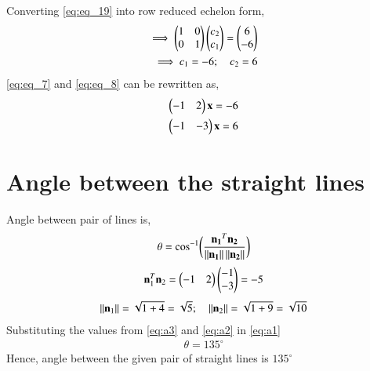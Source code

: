 \documentclass[journal,12pt,twocolumn]{IEEEtran}
\begin{document}
Converting \eqref{eq:eq_19} into row reduced echelon form,
\begin{align}
    \implies \begin{pmatrix}1 & 0 \\ 0 & 1\end{pmatrix}\begin{pmatrix}c_2 \\ c_1\end{pmatrix} = \begin{pmatrix}6 \\ -6\end{pmatrix} \nonumber\\
    \implies c_1 = -6; \quad c_2 = 6 \label{eq:eq_20}
\end{align}
\eqref{eq:eq_7} and \eqref{eq:eq_8} can be rewritten as,
\begin{align}
    \begin{pmatrix}-1 & 2\end{pmatrix}\mathbf{x} = -6 \\
    \begin{pmatrix}-1 & -3\end{pmatrix}\mathbf{x} = 6
\end{align}

\section{Angle between the straight lines}
Angle between pair of lines is,
\begin{align}
    \theta = \cos^{-1}\biggl(\frac{\mathbf{n_1}^T\mathbf{n_2}}{\left\lVert\mathbf{n_1}\right\rVert\left\lVert\mathbf{n_2}\right\rVert}\biggr) \label{eq:a1}
\end{align}
\begin{align}
    \mathbf{n}_1^T\mathbf{n}_2 = \begin{pmatrix}-1 & 2\end{pmatrix}\begin{pmatrix}-1 \\ -3\end{pmatrix} = -5 \label{eq:a2} 
\end{align}
\begin{align}
    \left\lVert\mathbf{n}_1\right\rVert=\sqrt{1+4}=\sqrt{5}; \quad \left\lVert\mathbf{n}_2\right\rVert=\sqrt{1+9}=\sqrt{10} \label{eq:a3}
\end{align}
Substituting the values from \eqref{eq:a3} and \eqref{eq:a2} in \eqref{eq:a1}
\begin{align}
    \theta = 135^{\circ}
\end{align}
Hence, angle between the given pair of straight lines is $135^{\circ}$
\end{document}
